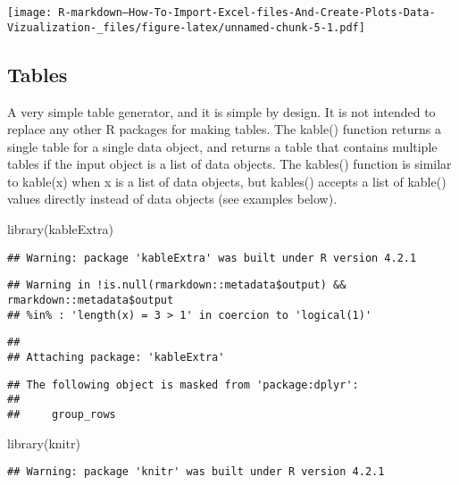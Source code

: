 \documentclass[
]{article}
\newenvironment{Shaded}{\begin{snugshade}}{\end{snugshade}}
\newcommand{\FunctionTok}[1]{\textcolor[rgb]{0.00,0.00,0.00}{#1}}
\newcommand{\NormalTok}[1]{#1}
\begin{document}
\texttt{[image: R-markdown---How-To-Import-Excel-files-And-Create-Plots-Data-Vizualization-\_files/figure-latex/unnamed-chunk-5-1.pdf]}

\hypertarget{tables}{%
\subsection{Tables}\label{tables}}

A very simple table generator, and it is simple by design. It is not
intended to replace any other R packages for making tables. The kable()
function returns a single table for a single data object, and returns a
table that contains multiple tables if the input object is a list of
data objects. The kables() function is similar to kable(x) when x is a
list of data objects, but kables() accepts a list of kable() values
directly instead of data objects (see examples below).

\begin{Shaded}
\begin{Highlighting}[]
\FunctionTok{library}\NormalTok{(kableExtra)}
\end{Highlighting}
\end{Shaded}

\begin{verbatim}
## Warning: package 'kableExtra' was built under R version 4.2.1
\end{verbatim}

\begin{verbatim}
## Warning in !is.null(rmarkdown::metadata$output) && rmarkdown::metadata$output
## %in% : 'length(x) = 3 > 1' in coercion to 'logical(1)'
\end{verbatim}

\begin{verbatim}
## 
## Attaching package: 'kableExtra'
\end{verbatim}

\begin{verbatim}
## The following object is masked from 'package:dplyr':
## 
##     group_rows
\end{verbatim}

\begin{Shaded}
\begin{Highlighting}[]
\FunctionTok{library}\NormalTok{(knitr)}
\end{Highlighting}
\end{Shaded}

\begin{verbatim}
## Warning: package 'knitr' was built under R version 4.2.1
\end{verbatim}
\end{document}
